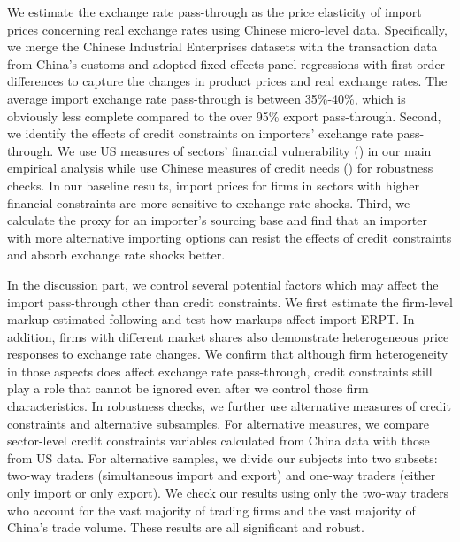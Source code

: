 \documentclass[12pt]{article}
\begin{document}
We estimate the exchange rate pass-through as the price elasticity of import prices concerning real exchange rates using Chinese micro-level data. Specifically, we merge the Chinese Industrial Enterprises datasets with the transaction data from China’s customs and adopted fixed effects panel regressions with first-order differences to capture the changes in product prices and real exchange rates. The average import exchange rate pass-through is between 35\%-40\%, which is obviously less complete compared to the over 95\% export pass-through. Second, we identify the effects of credit constraints on importers' exchange rate pass-through. We use US measures of sectors’ financial vulnerability (\cite{manova-wei-zhang2015}) in our main empirical analysis while use Chinese measures of credit needs (\cite{fan-li-yeaple2015}) for robustness checks. In our baseline results, import prices for firms in sectors with higher financial constraints are more sensitive to exchange rate shocks. Third, we calculate the proxy for an importer's sourcing base and find that an importer with more alternative importing options can resist the effects of credit constraints and absorb exchange rate shocks better.

In the discussion part, we control several potential factors which may affect the import pass-through other than credit constraints. We first estimate the firm-level markup estimated following \cite{dlw2012} and test how markups affect import ERPT. In addition, firms with different market shares also demonstrate heterogeneous price responses to exchange rate changes. We confirm that although firm heterogeneity in those aspects does affect exchange rate pass-through, credit constraints still play a role that cannot be ignored even after we control those firm characteristics. In robustness checks, we further use alternative measures of credit constraints and alternative subsamples. For alternative measures, we compare sector-level credit constraints variables calculated from China data with those from US data. For alternative samples, we divide our subjects into two subsets: two-way traders (simultaneous import and export) and one-way traders (either only import or only export). We check our results using only the two-way traders who account for the vast majority of trading firms and the vast majority of China's trade volume. These results are all significant and robust.
\end{document}
